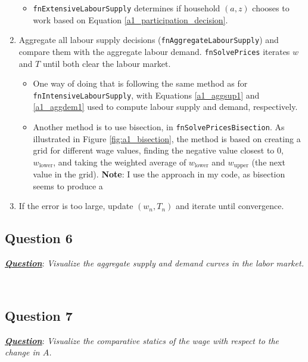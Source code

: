 \begin{enumerate}
\begin{itemize}
        \item \texttt{fnExtensiveLabourSupply} determines if household $(a,z)$ chooses to work based on Equation \eqref{a1_participation_decision}.  
    \end{itemize}
    \item Aggregate all labour supply decisions (\texttt{fnAggregateLabourSupply}) and compare them with the aggregate labour demand.
    \texttt{fnSolvePrices} iterates $w$ and $T$ until both clear the labour market. 
    \begin{itemize}
        \item One way of doing that is following the same method as for \texttt{fnIntensiveLabourSupply}, with Equations \eqref{a1_aggsup1} and \eqref{a1_aggdem1} used to compute labour supply and demand, respectively. 
        \item Another method is to use bisection, in \texttt{fnSolvePricesBisection}. 
        As illustrated in Figure \ref{fig:a1_bisection}, the method is based on creating a grid for different wage values, finding the negative value closest to $0$, $w_{\text{lower}}$, and taking the weighted average of $w_{\text{lower}}$ and $w_{\text{upper}}$ (the next value in the grid).
        \textbf{Note}: I use the  approach in my code, as bisection seems to produce a 
    \end{itemize}   
    \item If the error is too large, update $\left(w_n, T_n \right)$ and iterate until convergence.
\end{enumerate}

\subsection*{Question 6}

\colorbox{BurntOrange!25}{ \parbox{\textwidth}{
    \textbf{\textit{\underline{Question}}}:
\textit{
Visualize the aggregate supply and demand curves in the labor market.
}}}\\


\subsection*{Question 7}

\colorbox{BurntOrange!25}{ \parbox{\textwidth}{
    \textbf{\textit{\underline{Question}}}:
\textit{
Visualize the comparative statics of the wage with respect to the change in $A$.
}}}\\

